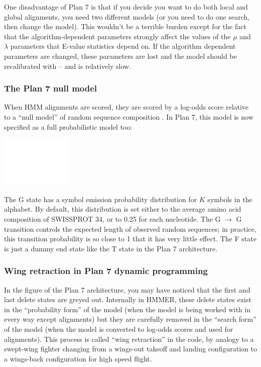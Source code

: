 One disadvantage of Plan 7 is that if you decide you want to do both
local and global alignments, you need two different models (or you
need to do one search, then change the model). This wouldn't be a
terrible burden except for the fact that the algorithm-dependent
parameters strongly affect the values of the $\mu$ and $\lambda$
parameters that E-value statistics depend on. If the algorithm
dependent parameters are changed, these parameters are lost and the
model should be recalibrated with  -- and
 is relatively slow.


\subsubsection{The Plan 7 null model}

When HMM alignments are scored, they are scored by a log-odds score
relative to a ``null model'' of random sequence composition
\cite{Barrett97}. In Plan 7, this model is now specified as a full
probabilistic model too:

\begin{center}
\includegraphics{nullmodel}
\end{center}

The G state has a symbol emission probability distribution for $K$
symbols in the alphabet. By default, this distribution is set either
to the average amino acid composition of SWISSPROT 34, or to 0.25 for
each nucleotide. The G $\rightarrow$ G transition controls the
expected length of observed random sequences; in practice, this
transition probability is so close to 1 that it has very little
effect. The F state is just a dummy end state like the T state in the
Plan 7 architecture.

\subsubsection{Wing retraction in Plan 7 dynamic programming}

In the figure of the Plan 7 architecture, you may have noticed that
the first and last delete states are greyed out. Internally in HMMER,
these delete states exist in the ``probability form'' of the model
(when the model is being worked with in every way except alignments)
but they are carefully removed in the ``search form'' of the model
(when the model is converted to log-odds scores and used for
alignments). This process is called ``wing retraction'' in the code,
by analogy to a swept-wing fighter changing from a wings-out takeoff
and landing configuration to a wings-back configuration for high speed
flight.


